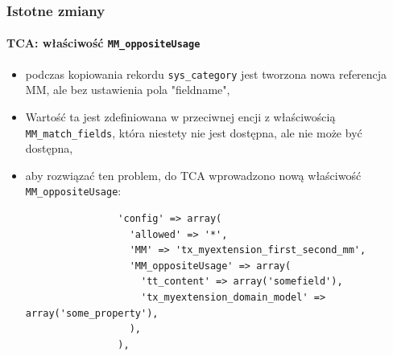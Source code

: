 \begin{frame}[fragile]
	\frametitle{Istotne zmiany}
	\framesubtitle{TCA: właściwość \texttt{MM\_oppositeUsage}}

	\lstset{
		basicstyle=\tiny\ttfamily
	}

	\begin{itemize}
		\item podczas kopiowania rekordu \texttt{sys\_category} jest tworzona nowa referencja MM, ale bez ustawienia pola "fieldname",
		\item Wartość ta jest zdefiniowana w przeciwnej encji z właściwością \texttt{MM\_match\_fields}, która niestety nie jest dostępna, ale nie może być dostępna,
		\item aby rozwiązać ten problem, do TCA wprowadzono nową właściwość \texttt{MM\_oppositeUsage}:

			\begin{lstlisting}
				'config' => array(
				  'allowed' => '*',
				  'MM' => 'tx_myextension_first_second_mm',
				  'MM_oppositeUsage' => array(
				    'tt_content' => array('somefield'),
				    'tx_myextension_domain_model' => array('some_property'),
				  ),
				),
			\end{lstlisting}

	\end{itemize}

\end{frame}


